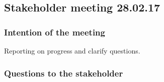 \documentclass{article}
\begin{document}
\begin{center}
\subsection*{Stakeholder meeting 28.02.17}
\end{center}

\bigskip


\subsubsection*{Intention of the meeting}
Reporting on progress and clarify questions.


\subsubsection*{Questions to the stakeholder}
\end{document}
